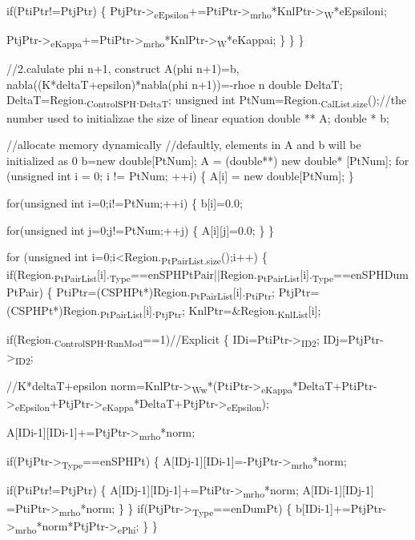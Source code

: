 \documentclass[presentation]{beamer}
\begin{document}
if(PtiPtr!=PtjPtr)
  \{
    PtjPtr->\textsubscript{eEpsilon}+=PtiPtr->\textsubscript{mrho}*KnlPtr->\textsubscript{W}*eEpsiloni;

        PtjPtr->\textsubscript{eKappa}+=PtiPtr->\textsubscript{mrho}*KnlPtr->\textsubscript{W}*eKappai;
      \}
  \}
\}

//2.calulate phi n+1, construct A(phi n+1)=b, nabla((K*deltaT+epsilon)*nabla(phi n+1))=-rhoe n
double DeltaT;
DeltaT=Region.\textsubscript{ControlSPH}.\textsubscript{DeltaT};
unsigned int PtNum=Region.\textsubscript{CalList.size}();//the number used to initializae the size of linear equation
double ** A;
double * b;

//allocate memory dynamically
//defaultly, elements in A and b will be initialized as 0
b=new double[PtNum];
A = (double**) new double* [PtNum];
for (unsigned int i = 0; i != PtNum; ++i)
  \{
    A[i] = new double[PtNum];
  \}

for(unsigned int i=0;i!=PtNum;++i)
  \{
    b[i]=0.0;

  for(unsigned int j=0;j!=PtNum;++j)
    \{
      A[i][j]=0.0;
    \}
\}

for (unsigned int i=0;i<Region.\textsubscript{PtPairList.size}();i++)                
  \{                                                                   
    if(Region.\textsubscript{PtPairList}[i].\textsubscript{Type}==enSPHPtPair||Region.\textsubscript{PtPairList}[i].\textsubscript{Type}==enSPHDumPtPair)
      \{
        PtiPtr=(CSPHPt*)Region.\textsubscript{PtPairList}[i].\textsubscript{PtiPtr};
        PtjPtr=(CSPHPt*)Region.\textsubscript{PtPairList}[i].\textsubscript{PtjPtr};
        KnlPtr=\&Region.\textsubscript{KnlList}[i];

if(Region.\textsubscript{ControlSPH}.\textsubscript{RunMod}==1)//Explicit
  \{
    IDi=PtiPtr->\textsubscript{ID2};
    IDj=PtjPtr->\textsubscript{ID2};

//K*deltaT+epsilon
norm=KnlPtr->\textsubscript{Ww}*(PtiPtr->\textsubscript{eKappa}*DeltaT+PtiPtr->\textsubscript{eEpsilon}+PtjPtr->\textsubscript{eKappa}*DeltaT+PtjPtr->\textsubscript{eEpsilon});    

A[IDi-1][IDi-1]+=PtjPtr->\textsubscript{mrho}*norm;

if(PtjPtr->\textsubscript{Type}==enSPHPt)
  \{
    A[IDj-1][IDi-1]=-PtjPtr->\textsubscript{mrho}*norm;

      if(PtiPtr!=PtjPtr)
        \{
          A[IDj-1][IDj-1]+=PtiPtr->\textsubscript{mrho}*norm;
          A[IDi-1][IDj-1] =PtiPtr->\textsubscript{mrho}*norm;
        \}
    \}
  if(PtjPtr->\textsubscript{Type}==enDumPt)
    \{
      b[IDi-1]+=PtjPtr->\textsubscript{mrho}*norm*PtjPtr->\textsubscript{ePhi};
    \}
\}
\end{document}
